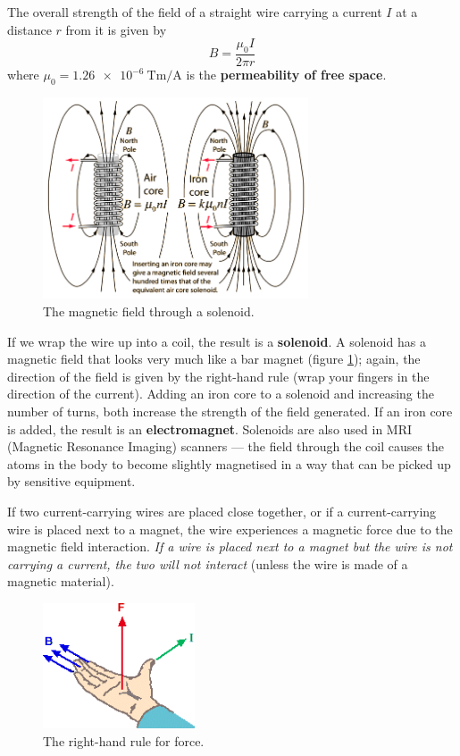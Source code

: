 \documentclass[a4paper]{amsbook}
\newcommand\capcite[1]{}
\begin{document}
The overall strength of the field of a straight wire carrying a current $ I $ at a distance $ r $ from it is given by
\begin{equation}
  B = \frac{\mu_0 I}{2\pi r}
\end{equation}
where $ \mu_0 = \SI{1.26e-6}{\tesla\metre\per\ampere} $ is the \textbf{permeability of free space}.

\begin{figure}
  \centering
  \includegraphics[width=0.7\textwidth]{solenoid}
  \caption{The magnetic field through a solenoid. \capcite{http://hyperphysics.phy-astr.gsu.edu/hbase/magnetic/imgmag/icore.gif}\label{fig:solenoid}}
\end{figure}
If we wrap the wire up into a coil, the result is a \textbf{solenoid}. A solenoid has a magnetic field that looks very much like
a bar magnet (figure \ref{fig:solenoid}); again, the direction of the field is given by the right-hand rule (wrap your fingers in
the direction of the current). Adding an iron core to a solenoid and increasing the number of turns, both increase the strength
of the field generated. If an iron core is added, the result is an \textbf{electromagnet}. Solenoids are also used in MRI (Magnetic
Resonance Imaging) scanners --- the field through the coil causes the atoms in the body to become slightly magnetised in a way
that can be picked up by sensitive equipment.

If two current-carrying wires are placed close together, or if a current-carrying wire is placed next to a magnet, the wire experiences
a magnetic force due to the magnetic field interaction. \textit{If a wire is placed next to a magnet but the wire is not carrying a current,
the two will not interact} (unless the wire is made of a magnetic material).

\begin{figure}
  \centering
  \includegraphics[width=0.4\textwidth]{rhr2}
  \caption{The right-hand rule for force. \capcite{http://www.ph.unimelb.edu.au/~mkl/640162/prot/module1/image/RHruleI.gif}\label{fig:rhr2}}
\end{figure}
\end{document}
